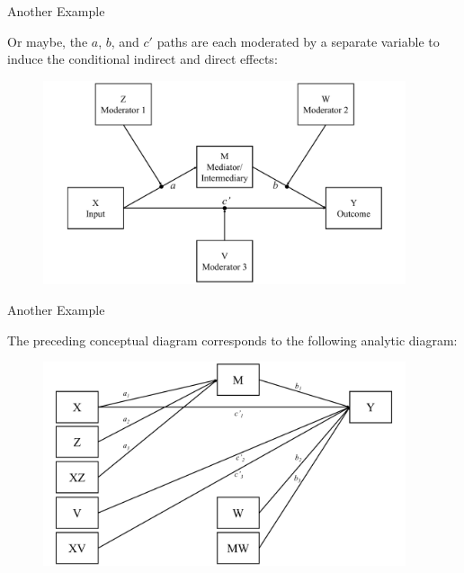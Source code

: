 \documentclass{beamer}
\newcommand{\vb}[0]{\vspace{6pt}}
\begin{document}
\begin{frame}{Another Example}
  
  Or maybe, the $a$, $b$, and $c'$ paths are each moderated by a
  separate variable to induce the conditional indirect and direct
  effects: 
  \vb
  \begin{figure}
    \includegraphics[width=0.95\textwidth]{figures/modAwithZ_BwithW_CwithVConceptual.pdf}
  \end{figure}
  
\end{frame}



\begin{frame}{Another Example}
  
  The preceding conceptual diagram corresponds to the following
  analytic diagram: 
  \vb
  \begin{figure}
    \includegraphics[width=0.95\textwidth]{figures/modAwithZ_BwithW_CwithVAnalytic.pdf}
  \end{figure}
  
\end{frame}
\end{document}

